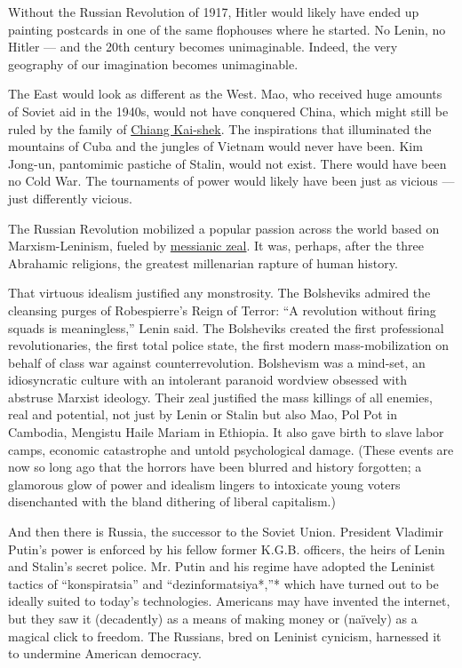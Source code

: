 Without the Russian Revolution of 1917, Hitler would likely have ended
up painting postcards in one of the same flophouses where he started. No
Lenin, no Hitler --- and the 20th century becomes unimaginable. Indeed,
the very geography of our imagination becomes unimaginable.

The East would look as different as the West. Mao, who received huge
amounts of Soviet aid in the 1940s, would not have conquered China,
which might still be ruled by the family of
\href{https://www.nytimes3xbfgragh.onion/topic/person/chiang-kaishek}{Chiang
Kai-shek}. The inspirations that illuminated the mountains of Cuba and
the jungles of Vietnam would never have been. Kim Jong-un, pantomimic
pastiche of Stalin, would not exist. There would have been no Cold War.
The tournaments of power would likely have been just as vicious --- just
differently vicious.

The Russian Revolution mobilized a popular passion across the world
based on Marxism-Leninism, fueled by
\href{https://www.ft.com/content/21eccc8e-7d35-11e7-ab01-a13271d1ee9c}{messianic
zeal}. It was, perhaps, after the three Abrahamic religions, the
greatest millenarian rapture of human history.

That virtuous idealism justified any monstrosity. The Bolsheviks admired
the cleansing purges of Robespierre's Reign of Terror: ``A revolution
without firing squads is meaningless,'' Lenin said. The Bolsheviks
created the first professional revolutionaries, the first total police
state, the first modern mass-mobilization on behalf of class war against
counterrevolution. Bolshevism was a mind-set, an idiosyncratic culture
with an intolerant paranoid wordview obsessed with abstruse Marxist
ideology. Their zeal justified the mass killings of all enemies, real
and potential, not just by Lenin or Stalin but also Mao, Pol Pot in
Cambodia, Mengistu Haile Mariam in Ethiopia. It also gave birth to slave
labor camps, economic catastrophe and untold psychological damage.
(These events are now so long ago that the horrors have been blurred and
history forgotten; a glamorous glow of power and idealism lingers to
intoxicate young voters disenchanted with the bland dithering of liberal
capitalism.)

And then there is Russia, the successor to the Soviet Union. President
Vladimir Putin's power is enforced by his fellow former K.G.B. officers,
the heirs of Lenin and Stalin's secret police. Mr. Putin and his regime
have adopted the Leninist tactics of ``konspiratsia'' and
``dezinformatsiya*,''* which have turned out to be ideally suited to
today's technologies. Americans may have invented the internet, but they
saw it (decadently) as a means of making money or (naïvely) as a magical
click to freedom. The Russians, bred on Leninist cynicism, harnessed it
to undermine American democracy.

